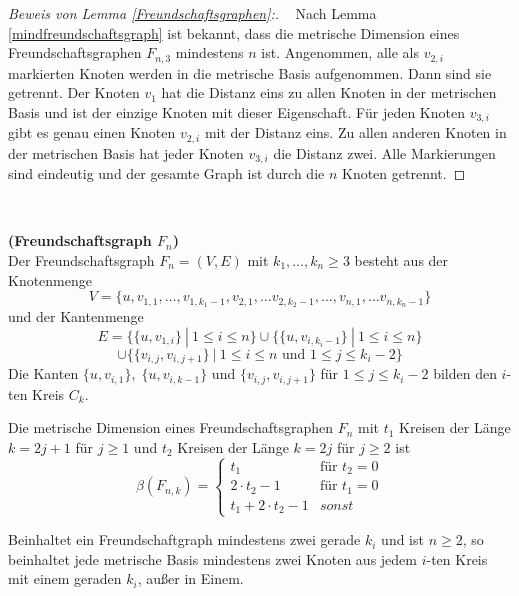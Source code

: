 \newpage
\begin{proof}[Beweis von Lemma \ref{Freundschaftsgraphen}:] \vspace{+1mm} ~ \linebreak
Nach Lemma \ref{mindfreundschaftsgraph} ist bekannt, dass die metrische Dimension eines Freundschaftsgraphen $F_{n,3}$ mindestens $n$ ist. Angenommen, alle als $v_{2,i}$ markierten Knoten werden in die metrische Basis aufgenommen. Dann sind sie getrennt. Der Knoten $v_1$ hat die Distanz eins zu allen Knoten in der metrischen Basis und ist der einzige Knoten mit dieser Eigenschaft. Für jeden Knoten $v_{3,i}$ gibt es genau einen Knoten $v_{2,i}$ mit der Distanz eins. Zu allen anderen Knoten in der metrischen Basis hat jeder Knoten $v_{3,i}$ die Distanz zwei. Alle Markierungen sind eindeutig und der gesamte Graph ist durch die $n$ Knoten getrennt.
\end{proof}
\vspace{-14mm}
~ \linebreak
\begin{defi}{\textbf{(Freundschaftsgraph $F_n$)}}\\
Der Freundschaftsgraph $F_{n}=(V,E)$ mit $k_1,\ldots, k_n \geq 3 $ besteht aus der Knotenmenge $$V = \{u,v_{1,1}, \ldots, v_{1,k_1-1},v_{2,1},\ldots v_{2,k_2-1},\ldots,v_{n,1},\ldots v_{n,k_n-1}\}$$ und der Kantenmenge $$E = \{ \{u,v_{1,i}\}~|~ 1 \leq i \leq n \} \cup \{ \{u,v_{i,k_i-1}\}~|~ 1 \leq i \leq n \}$$$$\cup \{ \{ v_{i,j}, v_{i,j+1} \} ~|~ 1 \leq i \leq n \text{ und }1 \leq j \leq k_i-2\}$$
Die Kanten $\{u,v_{i,1}\},\;\{u,v_{i,k-1}\}$ und $\{v_{i,j},v_{i,j+1}\}$ für $1 \leq j \leq k_i-2$ bilden den $i$-ten Kreis $C_k$.
\end{defi}

\begin{lem} \cite{amal}
\label{verallgFreundschaftsgraphen}
Die metrische Dimension eines Freundschaftsgraphen $F_{n}$ mit $t_1$ Kreisen der Länge $k=2j+1$ für $j \geq 1$ und $t_2$ Kreisen der Länge $k=2j$ für $j \geq 2$ ist 
\begin{equation}
   \beta(F_{n,k})=
   \begin{cases}
     t_1 & \text{f\"ur } t_2=0 \\
     2\cdot t_2-1 & \text{f\"ur } t_1=0 \\
     t_1+ 2\cdot t_2-1 & sonst
   \end{cases}
\end{equation}
\end{lem}
\begin{lem}
Beinhaltet ein Freundschaftgraph mindestens zwei gerade $k_i$ und ist $n\geq 2$, so beinhaltet jede metrische Basis mindestens zwei Knoten aus jedem $i$-ten Kreis mit einem geraden $k_i$, außer in Einem.  
\end{lem}
